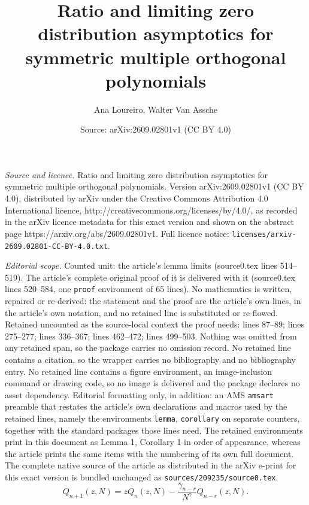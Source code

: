 \documentclass[10pt,a4paper]{amsart}
\title{Ratio and limiting zero distribution asymptotics for symmetric multiple orthogonal polynomials}
\author{Ana Loureiro, Walter Van Assche}
\date{Source: arXiv:2609.02801v1 (CC BY 4.0)}
\begin{document}
\maketitle

\noindent\emph{Source and licence.} Ratio and limiting zero distribution asymptotics for symmetric multiple orthogonal polynomials. Version arXiv:2609.02801v1 (CC BY 4.0), distributed by arXiv under the Creative Commons Attribution 4.0 International licence, http://creativecommons.org/licenses/by/4.0/, as recorded in the arXiv licence metadata for this exact version and shown on the abstract page https://arxiv.org/abs/2609.02801v1. Full licence notice: \texttt{licenses/arxiv-2609.02801-CC-BY-4.0.txt}.\par\smallskip

\noindent\textit{Editorial scope.} Counted unit: the article's lemma limits (source0.tex lines 514--519). The article's complete original proof of it is delivered with it (source0.tex lines 520--584, one \texttt{proof} environment of 65 lines). No mathematics is written, repaired or re-derived: the statement and the proof are the article's own lines, in the article's own notation, and no retained line is substituted or re-flowed.  Retained uncounted as the source-local context the proof needs: lines 87--89; lines 275--277; lines 336--367; lines 462--472; lines 499--503.  Nothing was omitted from any retained span, so the package carries no omission record.  No retained line contains a citation, so the wrapper carries no bibliography and no bibliography entry.  No retained line contains a figure environment, an image-inclusion command or drawing code, so no image is delivered and the package declares no asset dependency.  Editorial formatting only, in addition: an AMS \texttt{amsart} preamble that restates the article's own declarations and macros used by the retained lines, namely the environments \texttt{lemma}, \texttt{corollary} on separate counters, together with the standard packages those lines need.  The retained environments print in this document as Lemma 1, Corollary 1 in order of appearance, whereas the article prints the same items with the numbering of its own full document.  The complete native source of the article as distributed in the arXiv e-print for this exact version is bundled unchanged as \texttt{sources/209235/source0.tex}.
\begin{equation}  \label{eq:2}
   Q_{n+1}(z,N) = zQ_n(z,N) - \frac{\gamma_{n-r}}{N^\gamma} Q_{n-r}(z,N).
\end{equation}
\end{document}
